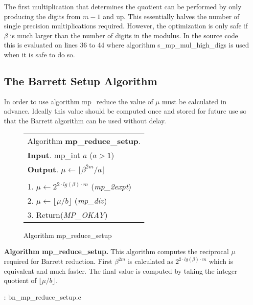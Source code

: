 \documentclass[b5paper]{book}
\begin{document}
The first multiplication that determines the quotient can be performed by only producing the digits from $m - 1$ and up.  This essentially halves
the number of single precision multiplications required.  However, the optimization is only safe if $\beta$ is much larger than the number of digits
in the modulus.  In the source code this is evaluated on lines 36 to 44 where algorithm s\_mp\_mul\_high\_digs is used when it is
safe to do so.  

\subsection{The Barrett Setup Algorithm}
In order to use algorithm mp\_reduce the value of $\mu$ must be calculated in advance.  Ideally this value should be computed once and stored for
future use so that the Barrett algorithm can be used without delay.  

\newpage\begin{figure}[!here]
\begin{small}
\begin{center}
\begin{tabular}{l}
\hline Algorithm \textbf{mp\_reduce\_setup}. \\
\textbf{Input}.   mp\_int $a$ ($a > 1$)  \\
\textbf{Output}.  $\mu \leftarrow \lfloor \beta^{2m}/a \rfloor$ \\
\hline \\
1.  $\mu \leftarrow 2^{2 \cdot lg(\beta) \cdot  m}$ (\textit{mp\_2expt}) \\
2.  $\mu \leftarrow \lfloor \mu / b \rfloor$ (\textit{mp\_div}) \\
3.  Return(\textit{MP\_OKAY}) \\
\hline
\end{tabular}
\end{center}
\end{small}
\caption{Algorithm mp\_reduce\_setup}
\end{figure}

\textbf{Algorithm mp\_reduce\_setup.}
This algorithm computes the reciprocal $\mu$ required for Barrett reduction.  First $\beta^{2m}$ is calculated as $2^{2 \cdot lg(\beta) \cdot  m}$ which
is equivalent and much faster.  The final value is computed by taking the integer quotient of $\lfloor \mu / b \rfloor$.

\vspace{+3mm}\begin{small}
\hspace{-5.1mm}{\bf File}: bn\_mp\_reduce\_setup.c
\vspace{-3mm}
\begin{alltt}
\end{alltt}
\end{small}
\end{document}
